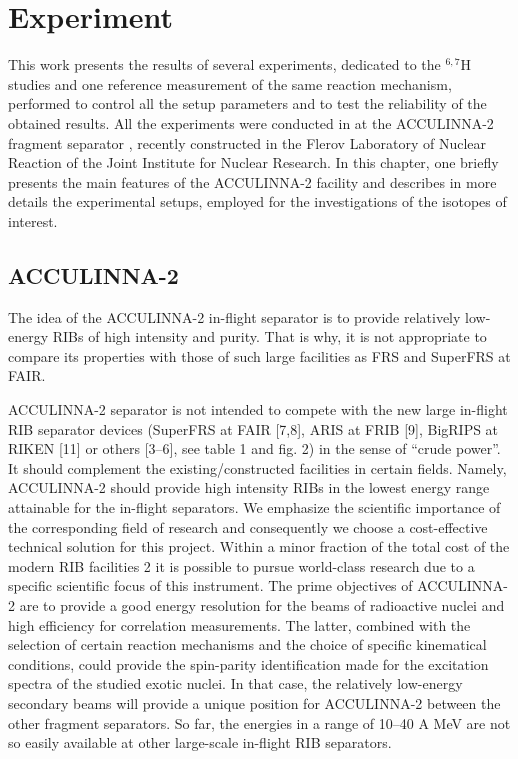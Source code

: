 \section{Experiment}

This work presents the results of several experiments, dedicated to the $^{6,7}$H studies and one reference measurement of the same reaction mechanism, performed to control all the setup parameters and to test the reliability of the obtained results.
All the experiments were conducted in at the ACCULINNA-2 fragment separator \cite{Fomichev:2018}, recently constructed in the Flerov Laboratory of Nuclear Reaction of the Joint Institute for Nuclear Research. 
In this chapter, one briefly presents the main features of the ACCULINNA-2 facility and describes in more details the experimental setups, employed for the investigations of the isotopes of interest.

\subsection{ACCULINNA-2}

The idea of the ACCULINNA-2 in-flight separator is to provide relatively low-energy RIBs of high intensity and purity. 
That is why, it is not appropriate to compare its properties with those of such large facilities as FRS \cite{geissel:1992} and SuperFRS \cite{geissel:2003,winkler:2008} at FAIR.

ACCULINNA-2 separator is not intended to compete with the new large in-flight RIB separator devices (SuperFRS
at FAIR [7,8], ARIS at FRIB [9], BigRIPS at RIKEN [11] or others [3–6], see table 1 and fig. 2) in the sense of “crude power”. 
It should complement the existing/constructed facilities in certain fields. 
Namely, ACCULINNA-2 should provide high intensity RIBs in the lowest energy range attainable for the in-flight separators. 
We emphasize the scientific importance of the corresponding field of research and consequently we choose a cost-effective technical solution for this project. 
Within a minor fraction of the total cost of the modern RIB facilities 2 it is possible to pursue world-class research due to a specific scientific focus of this instrument. 
The prime objectives of ACCULINNA-2 are to provide a good energy resolution for the beams of radioactive nuclei and high efficiency for correlation measurements. 
The latter, combined with the selection of certain reaction mechanisms and the choice of specific kinematical conditions, could provide the spin-parity identification made for the excitation spectra of the studied exotic nuclei. 
In that case, the relatively low-energy secondary beams will provide a unique position for ACCULINNA-2 between the other fragment separators. 
So far, the energies in a range of 10–40 A MeV are not so easily available at other large-scale in-flight RIB separators.

